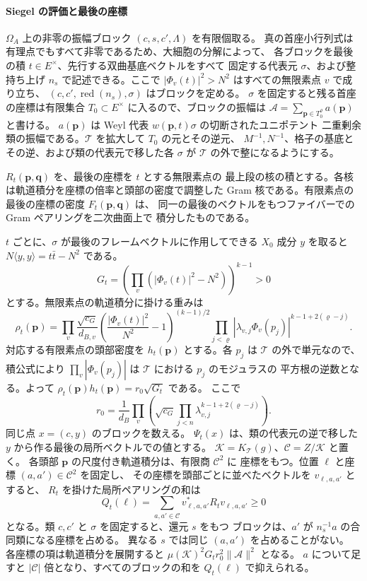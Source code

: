 \paragraph{Siegel の評価と最後の座標}
\(\Omega_A\) 上の非零の振幅ブロック \((c,s,c',\Lambda)\) を有限個取る。
真の首座小行列式は有理点でもすべて非零であるため、大細胞の分解によって、
各ブロックを最後の積 \(t\in E^\times\)、先行する双曲基底ベクトルをすべて
固定する代表元 \(\sigma\)、および整持ち上げ \(n_s\) で記述できる。ここで
\(|\Phi_v(t)|^2>N^2\) はすべての無限素点 \(v\) で成り立ち、
\((c,c',\operatorname{red}(n_s),\sigma)\) はブロックを定める。
\(\sigma\) を固定すると残る首座の座標は有限集合 \(T_0\subset E^\times\)
に入るので、ブロックの振幅は
\(\mathcal A=\sum_{\mathbf p\in T_0^\varrho} a(\mathbf p)\) と書ける。
\(a(\mathbf p)\) は Weyl 代表 \(w(\mathbf p,t)\sigma\) の切断されたユニポテント
二重剰余類の振幅である。\(\mathcal T\) を拡大して \(T_0\) の元とその逆元、
\(M^{-1},N^{-1}\)、格子の基底とその逆、および類の代表元で移した各 \(\sigma\) が
\(\mathcal T\) の外で整になるようにする。

\(R_t(\mathbf p,\mathbf q)\) を、最後の座標を \(t\) とする無限素点の
最上段の核の積とする。各核は軌道積分を座標の倍率と頭部の密度で調整した
Gram 核である。有限素点の最後の座標の密度 \(F_t(\mathbf p,\mathbf q)\) は、
同一の最後のベクトルをもつファイバーでの Gram ペアリングを二次曲面上で
積分したものである。

\(t\) ごとに、\(\sigma\) が最後のフレームベクトルに作用してできる \(X_0\) 成分 \(y\)
を取ると \(N\langle y,y\rangle=t\bar t-N^2\) である。
\[
 G_t=\left(\prod_v(|\Phi_v(t)|^2-N^2)\right)^{k-1}>0
\]
とする。無限素点の軌道積分に掛ける重みは
\[
 \rho_t(\mathbf p)=
 \prod_v \frac{\sqrt{c_G}}{d_{B,v}}
 \left(\frac{|\Phi_v(t)|^2}{N^2}-1\right)^{(k-1)/2}
 \prod_{j<\varrho}|\lambda_{v,j}\Phi_v(p_j)|^{k-1+2(\varrho-j)} .
\]
対応する有限素点の頭部密度を \(h_t(\mathbf p)\) とする。各 \(p_j\) は
\(\mathcal T\) の外で単元なので、積公式により
\(\prod_v|\Phi_v(p_j)|\) は \(\mathcal T\) における \(p_j\) のモジュラスの
平方根の逆数となる。よって \(\rho_t(\mathbf p)h_t(\mathbf p)=r_0\sqrt{G_t}\) である。
ここで
\[
 r_0=\frac{1}{d_B}\prod_v
       \left(\sqrt{c_G}\prod_{j<n}\lambda_{v,j}^{k-1+2(\varrho-j)}\right).
\]
同じ点 \(x=(c,y)\) のブロックを数える。
\(\Psi_t(x)\) は、類の代表元の逆で移した \(y\) から作る最後の局所ベクトルでの値とする。
\(\mathcal K=K_{\mathcal T}(g)\)、\(\mathcal C=Z/\mathcal K\) と置く。
各頭部 \(\mathbf p\) の尺度付き軌道積分は、有限商 \(\mathcal C^2\) に
座標をもつ。位置 \(\ell\) と座標 \((a,a')\in\mathcal C^2\) を固定し、
その座標を頭部ごとに並べたベクトルを \(v_{\ell,a,a'}\) とすると、
\(R_t\) を掛けた局所ペアリングの和は
\[
 Q_t(\ell)=\sum_{a,a'\in\mathcal C} v_{\ell,a,a'}^*R_t v_{\ell,a,a'}\ge0
\]
となる。類 \(c,c'\) と \(\sigma\) を固定すると、還元 \(s\) をもつ
ブロックは、\(a'\) が \(n_s^{-1}a\) の合同類になる座標を占める。
異なる \(s\) では同じ \((a,a')\) を占めることがない。
各座標の項は軌道積分を展開すると
\(\mu(\mathcal K)^2G_t r_0^2\|\mathcal A\|^2\) となる。
\(a\) について足すと \(|\mathcal C|\) 倍となり、すべてのブロックの和を
\(Q_t(\ell)\) で抑えられる。

